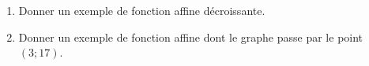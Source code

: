 
\begin{exercice}\label{exosmath-0127}

    \begin{enumerate}
        \item
            Donner un exemple de fonction affine décroissante.
        \item
            Donner un exemple de fonction affine dont le graphe passe par le point \( (3;17)\).
    \end{enumerate}

\end{exercice}
